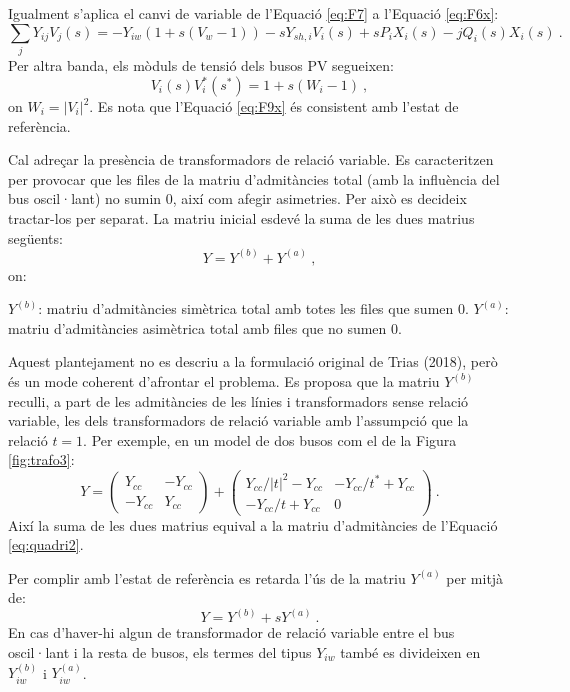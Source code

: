 Igualment s'aplica el canvi de variable de l'Equació \ref{eq:F7} a l'Equació \ref{eq:F6x}:
\begin{equation}
    \sum_{j}Y_{ij}V_j(s) = -Y_{iw}(1+s(V_w-1)) -sY_{sh,i}V_i(s)+sP_iX_i(s)-jQ_i(s)X_i(s)\ .
        \label{eq:F11x}
\end{equation}
Per altra banda, els mòduls de tensió dels busos PV segueixen:
\begin{equation}
    V_i(s)V^*_i(s^*)=1+s(W_i-1)\ ,
    \label{eq:F9x}
\end{equation}
on $W_i=|V_i|^2$. Es nota que l'Equació \ref{eq:F9x} és consistent amb l'estat de referència. 

Cal adreçar la presència de transformadors de relació variable. Es caracteritzen per provocar que les files de la matriu d'admitàncies total (amb la influència del bus oscil·lant) no sumin 0, així com afegir asimetries. Per això es decideix tractar-los per separat. La matriu inicial esdevé la suma de les dues matrius següents:
\begin{equation}
    Y = Y^{(b)} + Y^{(a)}\ ,
        \label{eq:F8x}
\end{equation}
on:

\vs
$Y^{(b)}$: matriu d'admitàncies simètrica total amb totes les files que sumen 0.
\vs
$Y^{(a)}$: matriu d'admitàncies asimètrica total amb files que no sumen 0.

Aquest plantejament no es descriu a la formulació original de Trias (2018), però és un mode coherent d'afrontar el problema. Es proposa que la matriu $Y^{(b)}$ reculli, a part de les admitàncies de les línies i transformadors sense relació variable, les dels transformadors de relació variable amb l'assumpció que la relació $t=1$. Per exemple, en un model de dos busos com el de la Figura \ref{fig:trafo3}:
\begin{equation}
    Y=
    \begin{pmatrix}
        Y_{cc} & -Y_{cc} \\
        -Y_{cc} & Y_{cc} 
    \end{pmatrix}
    +
    \begin{pmatrix}
        Y_{cc}/|t|^2-Y_{cc} & -Y_{cc}/t^*+Y_{cc} \\
        -Y_{cc}/t+Y_{cc} & 0
    \end{pmatrix}\ .
    \label{eq:quadri2MIH}
\end{equation}
Així la suma de les dues matrius equival a la matriu d'admitàncies de l'Equació \ref{eq:quadri2}. 

Per complir amb l'estat de referència es retarda l'ús de la matriu $Y^{(a)}$ per mitjà de:
\begin{equation}
    Y = Y^{(b)} + sY^{(a)}\ .
        \label{eq:F10x}
\end{equation}
En cas d'haver-hi algun de transformador de relació variable entre el bus oscil·lant i la resta de busos, els termes del tipus $Y_{iw}$ també es divideixen en $Y^{(b)}_{iw}$ i $Y^{(a)}_{iw}$. 

